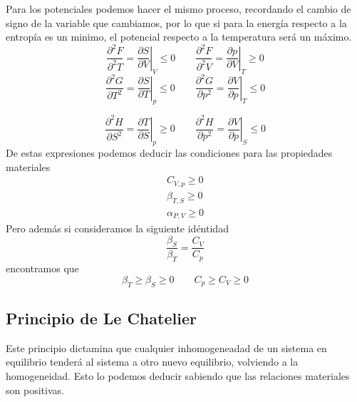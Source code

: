 \documentclass{book}
\numberwithin{equation}{section} %
\begin{document}
Para los potenciales podemos hacer el mismo proceso, recordando el cambio de signo de la variable que cambiamos, por lo que si para la energía respecto a la entropía es un minimo, el potencial respecto a la temperatura será un máximo.
\begin{equation}
    \left.\frac{\partial^2 F}{\partial^2 T}\right. = \left.\frac{\partial S}{\partial V}\right|_V \leq 0 \qquad
    \left. \frac{\partial^2 F}{\partial^2 V}\right. = \left.\frac{\partial p}{\partial V}\right|_T \geq 0
\end{equation}
\begin{equation}
    \left.\frac{\partial^2 G}{\partial T^2}\right. = \left.\frac{\partial S}{\partial T}\right|_p \leq 0 \qquad
    \left.\frac{\partial^2 G}{\partial p^2}\right. = \left.\frac{\partial V}{\partial p}\right|_T \leq 0
\end{equation}

\begin{equation}
    \left.\frac{\partial^2 H}{\partial S^2}\right. = \left.\frac{\partial T}{\partial S}\right|_p \geq 0 \qquad
    \left.\frac{\partial^2 H}{\partial p^2}\right. = \left.\frac{\partial V}{\partial p}\right|_S \leq 0
\end{equation}
De estas expresiones podemos deducir las condiciones para las propiedades materiales
\begin{equation}
\begin{gathered}
    C_{V,p} \geq 0\\
    \beta_{T,S} \geq 0\\
    \alpha_{P,V} \geq 0
\end{gathered}
\end{equation}
Pero además si consideramos la siguiente idéntidad
\begin{equation}
    \frac{\beta_S}{\beta_T} = \frac{C_V}{C_p}
\end{equation}
encontramos que
\begin{equation}
    \beta_T \geq \beta_S \geq 0 \qquad C_p \geq C_V \geq 0
\end{equation}

\subsection{Principio de Le Chatelier}
Este principio dictamina que cualquier inhomogeneadad de un sistema en equilibrio tenderá al sistema a otro nuevo equilibrio, volviendo a la homogeneidad.
Esto lo podemos deducir sabiendo que las relaciones materiales son positivas.
\end{document}
